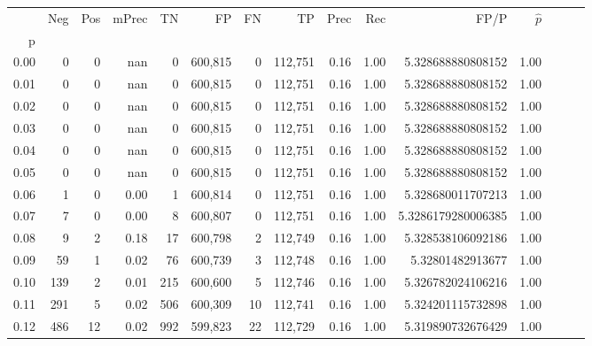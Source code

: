 \begin{tabular}{rrrrrrrrrrrrrrr}
\toprule
{} &     Neg &    Pos & mPrec &       TN &       FP &       FN &       TP &  Prec &   Rec &                    FP/P & $\hat{p}$ \\
p    &         &        &       &          &          &          &          &       &       &                         &           \\
\midrule
0.00 &       0 &      0 &   nan &        0 &  600,815 &        0 &  112,751 &  0.16 &  1.00 &       5.328688880808152 &      1.00 \\
0.01 &       0 &      0 &   nan &        0 &  600,815 &        0 &  112,751 &  0.16 &  1.00 &       5.328688880808152 &      1.00 \\
0.02 &       0 &      0 &   nan &        0 &  600,815 &        0 &  112,751 &  0.16 &  1.00 &       5.328688880808152 &      1.00 \\
0.03 &       0 &      0 &   nan &        0 &  600,815 &        0 &  112,751 &  0.16 &  1.00 &       5.328688880808152 &      1.00 \\
0.04 &       0 &      0 &   nan &        0 &  600,815 &        0 &  112,751 &  0.16 &  1.00 &       5.328688880808152 &      1.00 \\
0.05 &       0 &      0 &   nan &        0 &  600,815 &        0 &  112,751 &  0.16 &  1.00 &       5.328688880808152 &      1.00 \\
0.06 &       1 &      0 &  0.00 &        1 &  600,814 &        0 &  112,751 &  0.16 &  1.00 &       5.328680011707213 &      1.00 \\
0.07 &       7 &      0 &  0.00 &        8 &  600,807 &        0 &  112,751 &  0.16 &  1.00 &      5.3286179280006385 &      1.00 \\
0.08 &       9 &      2 &  0.18 &       17 &  600,798 &        2 &  112,749 &  0.16 &  1.00 &       5.328538106092186 &      1.00 \\
0.09 &      59 &      1 &  0.02 &       76 &  600,739 &        3 &  112,748 &  0.16 &  1.00 &        5.32801482913677 &      1.00 \\
0.10 &     139 &      2 &  0.01 &      215 &  600,600 &        5 &  112,746 &  0.16 &  1.00 &       5.326782024106216 &      1.00 \\
0.11 &     291 &      5 &  0.02 &      506 &  600,309 &       10 &  112,741 &  0.16 &  1.00 &       5.324201115732898 &      1.00 \\
0.12 &     486 &     12 &  0.02 &      992 &  599,823 &       22 &  112,729 &  0.16 &  1.00 &       5.319890732676429 &      1.00 \\

\end{tabular}
